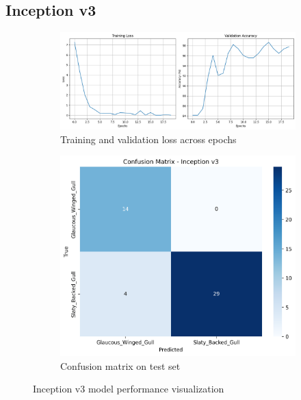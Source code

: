 \documentclass[a4paper,12pt]{report}
\begin{document}
\subsection{Inception v3}
\begin{figure}[H]
    \centering
    \begin{subfigure}[b]{0.48\textwidth}
        \centering
        \includegraphics[width=\textwidth]{images/appendix/modelgraph/inception/inception.png}
        \caption{Training and validation loss across epochs}
        \label{fig:inception_training}
    \end{subfigure}
    \hfill
    \begin{subfigure}[b]{0.48\textwidth}
        \centering
        \includegraphics[width=\textwidth]{images/appendix/modelgraph/inception/inception_v3_confusion_matrix.png}
        \caption{Confusion matrix on test set}
        \label{fig:inception_confusion}
    \end{subfigure}
    \caption{Inception v3 model performance visualization}
    \label{fig:inception_performance}
\end{figure}
\end{document}
